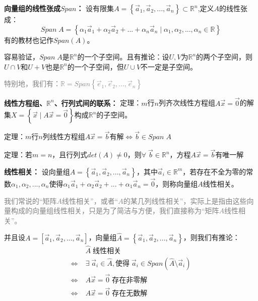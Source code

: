 \documentclass[zihao=-4,UTF8]{report}
\begin{document}
\textbf{向量组的线性张成$Span$：}
设有限集$A=\left \{ \vec{a}_{1},\vec{a}_{2},...,\vec{a}_{n} \right \}\subset \mathbb{R}^{n} $,定义$A$的线性张成：
\begin{equation*}
    Span\;A=\left \{  \alpha_{1}\vec{a}_{1}+\alpha_{2}\vec{a}_{2}+...+\alpha_{n}\vec{a}_{n}\;|\; \alpha_{1}, \alpha_{2},..., \alpha_{n} \in \mathbb{R} \right \} 
\end{equation*}
有的教材也记作$Span(A)$。\par
容易验证，$Span\;A$是$ \mathbb{R}^{n}$的一个子空间。且有推论：设$U,V$为$ \mathbb{R}^{n}$的两个子空间，则$U\cap V$和$U+V$也是$ \mathbb{R}^{n}$的一个子空间，但$U\cup V$不一定是子空间。\par
\textcolor{gray}{特别地，我们有：$\mathbb{R} = Span \left \{ \vec{e}_{1},\vec{e}_{2},...,\vec{e}_{n} \right \} $}

\textbf{线性方程组、$ \mathbb{R}^{n}$、行列式间的联系：}
定理：$m$行$n$列齐次线性方程组$A\vec{x}=\vec{0}$的解集$X=\left \{ \vec{x}\;|\;A\vec{x}=\vec{0} \right \} $构成$\mathbb{R}^{n}$的子空间。\par
定理：$m$行$n$列线性方程组$A\vec{x}=\vec{b}$有解$\Longleftrightarrow \vec{b}\in Span\;A$\par
定理：若$m=n$，且行列式$det(A)\ne 0$，则$\forall\;\vec{b}\in \mathbb{R}^n$，方程$A\vec{x}=\vec{b}$有唯一解

\textbf{线性相关：}
设向量组$A=\left \{ \vec{a}_1,\vec{a}_2,...,\vec{a}_n \right \} $，其中$\vec{a}_i\in \mathbb{R}^m$，若存在不全为零的常数$\alpha_1,\alpha_2,...,\alpha_n$使得$\alpha_1\vec{a}_1+\alpha_2\vec{a}_2+...+\alpha_1\vec{a}_n=\vec{0}$，则称向量组$A$线性相关。\par
\textcolor{gray}{我们常说的“矩阵$A$线性相关”，或者“$A$的某几列线性相关”，实际上是指由这些向量构成的向量组线性相关，只是为了简洁与方便，我们直接称为“矩阵$A$线性相关”。}\par
并且设$A=[\vec{a}_1,\vec{a}_2,...,\vec{a}_n]$，向量组$\hat{A}=\left \{ \vec{a}_1,\vec{a}_2,...,\vec{a}_n \right \}$，则我们有推论：
\begin{align*}
                        \;& \hat{A}\;\text{线性相关}\\
    \Longleftrightarrow \;& \exists\;\vec{a}_i\in \hat{A}, \text{使得}\;\vec{a}_i\in Span(\hat{A}\setminus {\vec{a}_i})\\
    \Longleftrightarrow \;& A\vec{x}=\vec{0}\;\text{存在非零解}\\
    \Longleftrightarrow \;& A\vec{x}=\vec{0}\;\text{存在无数解}
\end{align*}
\end{document}
